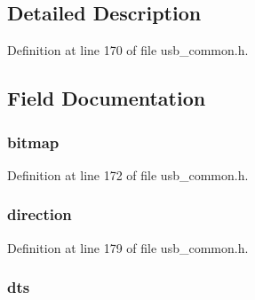 \subsection{Detailed Description}


Definition at line 170 of file usb\+\_\+common.\+h.



\subsection{Field Documentation}
\hypertarget{union_t_r_a_n_s_f_e_r___f_l_a_g_s_aeaf0bd08f496808a64c5beb062fb535e}{}
\subsubsection[{bitmap}]{ bitmap}\label{union_t_r_a_n_s_f_e_r___f_l_a_g_s_aeaf0bd08f496808a64c5beb062fb535e}


Definition at line 172 of file usb\+\_\+common.\+h.

\hypertarget{union_t_r_a_n_s_f_e_r___f_l_a_g_s_ad5fd6113d5a9e124e75b161c5df3b2b0}{}
\subsubsection[{direction}]{ direction}\label{union_t_r_a_n_s_f_e_r___f_l_a_g_s_ad5fd6113d5a9e124e75b161c5df3b2b0}


Definition at line 179 of file usb\+\_\+common.\+h.

\hypertarget{union_t_r_a_n_s_f_e_r___f_l_a_g_s_a57d302cdd3476d88108d675f9b3d2adb}{}
\subsubsection[{dts}]{ dts}\label{union_t_r_a_n_s_f_e_r___f_l_a_g_s_a57d302cdd3476d88108d675f9b3d2adb}



